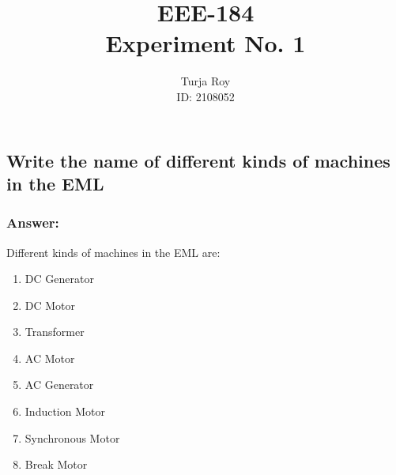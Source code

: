 \documentclass[12pt]{article}
\title{
    \textbf{EEE-184}\\
    \textbf{Experiment No. 1}
}
\author{
    Turja Roy\\
    ID: 2108052
}
\date{}
\begin{document}
\maketitle

\subsection{Write the name of different kinds of machines in the EML}
\subsubsection*{Answer:}
Different kinds of machines in the EML are:
\begin{enumerate}
    \item DC Generator
    \item DC Motor
    \item Transformer
    \item AC Motor
    \item AC Generator
    \item Induction Motor
    \item Synchronous Motor
    \item Break Motor
\end{enumerate}

\begin{figure}[h]
    \centering
\end{figure}
\end{document}

